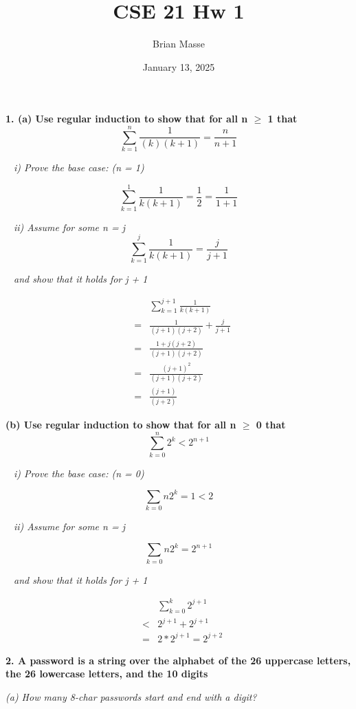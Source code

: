 \documentclass[12pt, letterpaper]{article}
\title{CSE 21 Hw 1}
\author{Brian Masse}
\date{January 13, 2025}
\begin{document}
\maketitle


\bf{ 1. (a) Use regular induction to show that for all n $\ge$ 1 that }
\[ \sum_{k=1}^{n} \frac{1}{(k)(k+1)} = \frac{n}{n+1}  \]

\-\ \it{ i) Prove the base case: (n = 1) }

\[ \sum_{k=1}^{1} \frac{1}{k( k + 1 )} = \frac{1}{2} = \frac{1}{1 + 1} \]

\-\ \it{ ii) Assume for some n = j  }
\[ \sum_{k=1}^{j} \frac{1}{k( k + 1 )} = \frac{j}{j + 1}\]

\-\ \it{ and show that it holds for j + 1  }

\begin{eqnarray}
&& \sum_{k=1}^{j + 1} \frac{1}{k( k + 1 )}\\
&=& \frac{1}{(j + 1)(j + 2)} + \frac{j}{j + 1}\\
&=& \frac{1 + j(j + 2)}{(j + 1)(j + 2)} \\
&=& \frac{ (j + 1)^{2} }{(j + 1)(j + 2)} \\
&=& \frac{ (j + 1) }{(j + 2)}
\end{eqnarray}

\bf{ (b) Use regular induction to show that for all n $\ge$ 0 that }
\[ \sum_{k=0}^{n} 2^{k} < 2^{n + 1}  \]

\-\ \it{ i) Prove the base case: (n = 0) }

\[ \sum_{k=0}{n} 2^{k} = 1 < 2 \]


\-\ \it{ ii) Assume for some n = j  }

\[ \sum_{k=0}{n} 2^{k} = 2^{n + 1}\]

\-\ \it{ and show that it holds for j + 1  }

\begin{eqnarray}
&& \sum_{k=0}^{k} 2^{j + 1} \\
&<& 2^{j + 1} + 2^{j + 1} \\
&=& 2*2^{j +1 } = 2^{j + 2}
\end{eqnarray}


\bf{ 2. A password is a string over the alphabet of the 26 uppercase letters, the 26 lowercase letters, and the 10 digits }

\it{ (a) How many 8-char passwords start and end with a digit?  }
\end{document}
